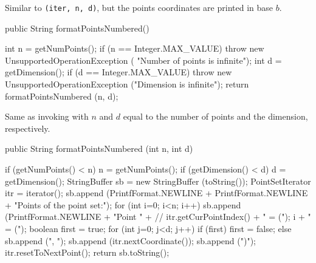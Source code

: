 \begin{tabb}
Similar to
\texttt{(iter, n, d)},
but the points coordinates are printed in base $b$.
\end{tabb}
\begin{htmlonly}
\end{htmlonly}
\begin{code}

   public String formatPointsNumbered() \begin{hide} {
      int n = getNumPoints();
      if (n == Integer.MAX_VALUE)
         throw new UnsupportedOperationException (
            "Number of points is infinite");
      int d = getDimension();
      if (d == Integer.MAX_VALUE)
         throw new UnsupportedOperationException ("Dimension is infinite");
      return formatPointsNumbered (n, d);
   }\end{hide}
\end{code}
\begin{tabb}
 Same as invoking 
  with $n$ and $d$ equal to the number of points and the dimension,
   respectively.
\end{tabb}
\begin{htmlonly}
\end{htmlonly}
\begin{code}

   public String formatPointsNumbered (int n, int d) \begin{hide} {
      if (getNumPoints() < n)
         n = getNumPoints();
      if (getDimension() < d)
         d = getDimension();
      StringBuffer sb = new StringBuffer (toString());
      PointSetIterator itr = iterator();
      sb.append (PrintfFormat.NEWLINE + PrintfFormat.NEWLINE
                 + "Points of the point set:");
      for (int i=0; i<n; i++) {
         sb.append (PrintfFormat.NEWLINE + "Point " +
    //                itr.getCurPointIndex() + " = (");
                                           i + "  =  (");
         boolean first = true;
         for (int j=0; j<d; j++) {
            if (first)
               first = false;
            else
               sb.append (", ");
            sb.append (itr.nextCoordinate());
         }
         sb.append (")");
         itr.resetToNextPoint();
      }
      return sb.toString();
   }\end{hide}
\end{code}
